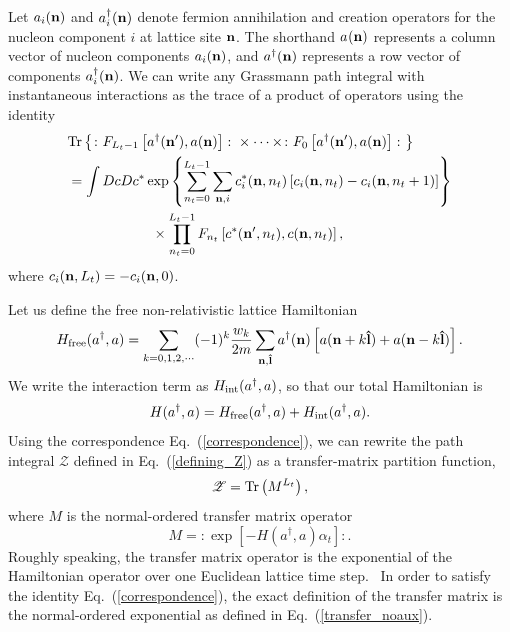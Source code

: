 Let $a_{i}({\bf n})$ and
$a_{i}^{\dagger}({\bf n})$ denote fermion annihilation and creation operators
for the nucleon component $i$ at lattice site ${\bf n}$.  The shorthand $a_{}({\bf
n})$ represents a column vector of nucleon components $a_{i}({\bf n})$, and
$a^{\dagger}({\bf n})$ represents a row vector of components $a^{\dagger}_{i}({\bf
n})$.  We can write any Grassmann path
integral with instantaneous interactions as the trace of a product of
operators using the identity \cite{Creutz:1988wv,Creutz:1999zy}%
\begin{align}
&  {\rm Tr}\left\{  \colon F_{L_{t}-1}\left[  a_{}^{\dagger}({\bf n}^{\prime}),a({\bf
n})\right]  \colon\times\cdots\times\colon
F_{0}\left[  a_{}^{\dagger}({\bf n}^{\prime}),a({\bf n})\right]
\colon\right\} \nonumber\\
&  =\int DcDc^{\ast}\exp\left\{  \sum_{n_t=0}^{L_{t}-1}\sum_{{\bf n},i}%
c_{i}^{\ast}({\bf n},n_t)\left[  c_{i}({\bf n},n_t)-c_{i}({\bf n}%
,n_t+1)\right]  \right\} \nonumber\\
&  \qquad\qquad\qquad\times\prod_{n_t=0}^{L_{t}-1}F_{n_t}\left[
c_{}^{\ast}({\bf n}^{\prime},n_t),c({\bf n},n_t)\right]
 ,
\label{correspondence}%
\end{align}
where $c_{i}({\bf n},L_{t})=-c_{i}({\bf n},0)$.

Let us define the free non-relativistic lattice Hamiltonian
\begin{equation}
H_{\rm free}(a^{\dagger},a) =\sum_{k=0,1,2,\cdots} (-1)^k \frac{w_k}{2m}
\sum_{{\bf n},{\bf \hat{l}}} a^{\dagger}({\bf n}) \left[ a({\bf n}+k{\bf\hat{l}})
+ a({\bf n}-k{\bf \hat{l}})\right].
\end{equation}
We write the interaction term as $H_{\rm int}(a^{\dagger},a)$, so that our
total Hamiltonian is
\begin{equation}
H(a^{\dagger},a) = H_{\rm free}(a^{\dagger},a) + H_{\rm int}(a^{\dagger},a).
\end{equation}Using the correspondence Eq.~(\ref{correspondence}), we can
rewrite the path
integral $\mathcal{Z}$ defined in Eq.~(\ref{defining_Z}) as a transfer-matrix
partition function,%
\begin{equation}
\mathcal{Z}={\rm Tr}\left(  M^{L_{t}}\right)  ,
\end{equation}
where $M$ is the normal-ordered transfer matrix operator%
\begin{equation}
M=:\exp\left[  -H(a^{\dagger},a)\alpha_{t}\right]  :. \label{transfer_noaux}%
\end{equation}
Roughly speaking, the transfer matrix operator is the exponential of the
Hamiltonian operator over one Euclidean lattice time step.
\ In order to satisfy the identity Eq.~(\ref{correspondence}), the exact
definition of the transfer matrix is the normal-ordered exponential as defined
in Eq.~(\ref{transfer_noaux}).


